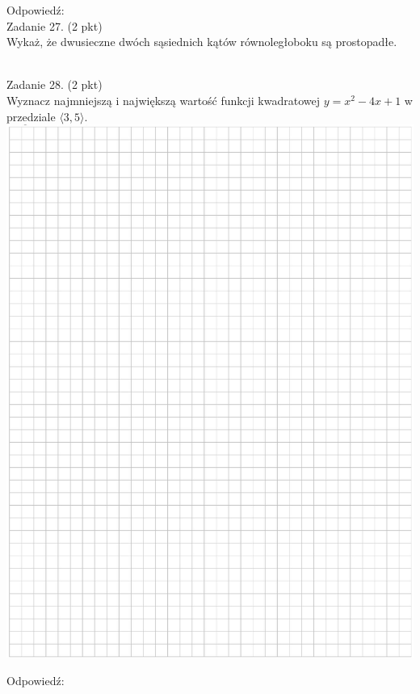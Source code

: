 \documentclass[10pt]{article}
\begin{document}
Odpowiedź:\\
Zadanie 27. (2 pkt)\\
Wykaż, że dwusieczne dwóch sąsiednich kątów równoległoboku są prostopadłe.\\
\(\qquad\)

Zadanie 28. (2 pkt)\\
Wyznacz najmniejszą i największą wartość funkcji kwadratowej \(y=x^{2}-4 x+1\) w przedziale \(\langle 3,5\rangle\).\\
\includegraphics[max width=\textwidth, center]{2024_11_21_b31e6de468170710de69g-11}

Odpowiedź:
\end{document}

